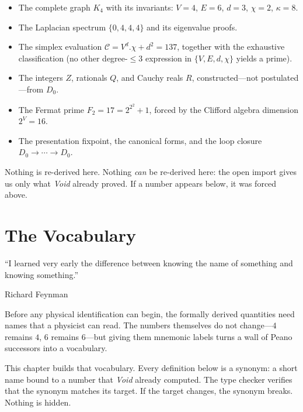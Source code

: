\documentclass[11pt,a4paper]{book}
\def\cdot{.}%
\def\mathbb#1{#1}%
\def\texttt#1{#1}%
\begin{document}
\begin{itemize}
\item The complete graph $K_4$ with its invariants: $V = 4$, $E = 6$, $d = 3$, $\chi = 2$, $\kappa = 8$.

\item The Laplacian spectrum $\{0,4,4,4\}$ and its eigenvalue proofs.

\item The simplex evaluation $\mathcal{C} = V^d \cdot \chi + d^2 = 137$, together with the exhaustive classification (no other degree-$\le 3$ expression in $\{V, E, d, \chi\}$ yields a prime).%

\item The integers $\mathbb{Z}$, rationals $\mathbb{Q}$, and Cauchy reals $\mathbb{R}$, constructed---not postulated---from $D_0$.

\item The Fermat prime $F_2 = 17 = 2^{2^2} + 1$, forced by the Clifford algebra dimension $2^V = 16$.

\item The presentation fixpoint, the canonical forms, and the loop closure $D_0 \to \cdots \to D_0$.
\end{itemize}

Nothing is re-derived here. Nothing \emph{can} be re-derived here: the \texttt{open import} gives us only what \textit{Void} already proved. If a number appears below, it was forced above.

\chapter{The Vocabulary}
\label{ch:the-vocabulary}

\epigraph{``I learned very early the difference between knowing the name of something and knowing something.''}{Richard Feynman}

Before any physical identification can begin, the formally derived quantities need names that a physicist can read. The numbers themselves do not change---$4$ remains $4$, $6$ remains $6$---but giving them mnemonic labels turns a wall of Peano successors into a vocabulary.

This chapter builds that vocabulary. Every definition below is a synonym: a short name bound to a number that \textit{Void} already computed. The type checker verifies that the synonym matches its target. If the target changes, the synonym breaks. Nothing is hidden.
\end{document}

